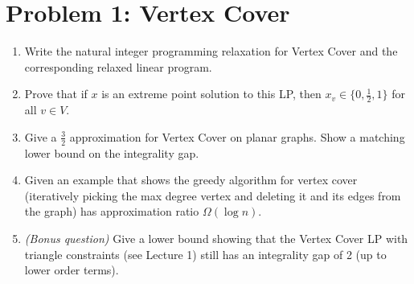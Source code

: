 



\noindent
   \begin{center}
   \end{center}


\section{Problem 1: Vertex Cover} 

\begin{enumerate}
\item Write the natural integer programming relaxation for Vertex Cover and the corresponding relaxed linear program.
\item Prove that if $x$ is an extreme point solution to this LP, then $x_v \in \{0,\frac{1}{2},1\}$ for all $v \in V$.
\item Give a $\frac{3}{2}$ approximation for Vertex Cover on planar graphs. Show a matching lower bound on the integrality gap.
\item Given an example that shows the greedy algorithm for vertex cover (iteratively picking the max degree vertex and deleting it and its edges from the graph) has approximation ratio $\Omega(\log n)$. 
\item \textit{(Bonus question)} Give a lower bound showing that the Vertex Cover LP with triangle constraints (see Lecture 1) still has an integrality gap of 2 (up to lower order terms).
\end{enumerate}

%

